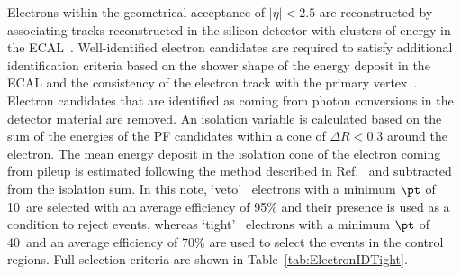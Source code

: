 Electrons within the geometrical acceptance of $|\eta| < 2.5$
are reconstructed by associating tracks reconstructed
in the silicon detector with clusters of energy in the ECAL~\cite{Khachatryan:2015hwa}.
Well-identified electron candidates are required to satisfy
additional identification criteria based on the shower
shape of the energy deposit in the ECAL and the consistency of the
electron track with the primary vertex~\cite{TRK-11-001}. Electron candidates
that are identified as coming from photon conversions in
the detector material are removed. An isolation variable is calculated based on the sum of the energies of the PF candidates within a cone of $\Delta R < 0.3$ around the electron. The mean energy deposit in the isolation cone of the electron coming from pileup is estimated following the method described in Ref.~\cite{Khachatryan:2015hwa} and subtracted from the isolation sum. In this note, `veto'~\cite{CMS-EGM-TWIKI-ELEID} electrons with a
minimum $\pt$ of 10~\GeV are selected with an average efficiency of 95\% and their presence is used as a condition to reject events, whereas `tight'~\cite{CMS-EGM-TWIKI-ELEID} electrons with a minimum $\pt$ of 40~\GeV and an average efficiency of 70\% are used to select the events
in the control regions. Full selection criteria are shown in Table~\ref{tab:ElectronIDTight}.

